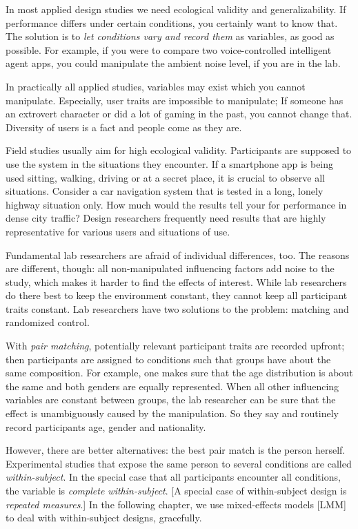 \documentclass[]{svmono}
\begin{document}
In most applied design studies we need ecological validity and
generalizability. If performance differs under certain conditions, you
certainly want to know that. The solution is to \emph{let conditions
vary and record them} as variables, as good as possible. For example, if
you were to compare two voice-controlled intelligent agent apps, you
could manipulate the ambient noise level, if you are in the lab.

In practically all applied studies, variables may exist which you cannot
manipulate. Especially, user traits are impossible to manipulate; If
someone has an extrovert character or did a lot of gaming in the past,
you cannot change that. Diversity of users is a fact and people come as
they are.

Field studies usually aim for high ecological validity. Participants are
supposed to use the system in the situations they encounter. If a
smartphone app is being used sitting, walking, driving or at a secret
place, it is crucial to observe all situations. Consider a car
navigation system that is tested in a long, lonely highway situation
only. How much would the results tell your for performance in dense city
traffic? Design researchers frequently need results that are highly
representative for various users and situations of use.

Fundamental lab researchers are afraid of individual differences, too.
The reasons are different, though: all non-manipulated influencing
factors add noise to the study, which makes it harder to find the
effects of interest. While lab researchers do there best to keep the
environment constant, they cannot keep all participant traits constant.
Lab researchers have two solutions to the problem: matching and
randomized control.

With \emph{pair matching}, potentially relevant participant traits are
recorded upfront; then participants are assigned to conditions such that
groups have about the same composition. For example, one makes sure that
the age distribution is about the same and both genders are equally
represented. When all other influencing variables are constant between
groups, the lab researcher can be sure that the effect is unambiguously
caused by the manipulation. So they say and routinely record
participants age, gender and nationality.

However, there are better alternatives: the best pair match is the
person herself. Experimental studies that expose the same person to
several conditions are called \emph{within-subject}. In the special case
that all participants encounter all conditions, the variable is
\emph{complete within-subject}. {[}A special case of within-subject
design is \emph{repeated measures}.{]} In the following chapter, we use
mixed-effects models {[}LMM{]} to deal with within-subject designs,
gracefully.
\end{document}
